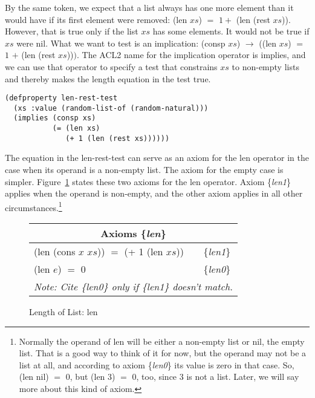 By the same token, we expect that a list always
has one more element than it would have if
its first element were removed: \textsf{(len $xs$)} $=$ $1 +$ \textsf{(len (rest $xs$))}.
However, that is true only if the list $xs$
has some elements. It would not be true if $xs$ were \textsf{nil}.
What we want to test is an implication:
\textsf{(consp $xs$)} $\rightarrow$ (\textsf{(len $xs$)} $=$ $1$ $+$ \textsf{(len (rest $xs$))}$)$.
The ACL2 name for the implication operator is \textsf{implies},
and we can use that operator to specify a test that
constrains $xs$ to non-empty lists and thereby
makes the length equation in the test true.

\begin{code}
\begin{verbatim}
(defproperty len-rest-test
  (xs :value (random-list-of (random-natural)))
  (implies (consp xs)
           (= (len xs)
              (+ 1 (len (rest xs))))))
\end{verbatim}
\end{code}

The equation in the len-rest-test can serve
as an axiom for the \textsf{len} operator in the case
when its operand is a non-empty list.
The axiom for the empty case is simpler.
Figure~\ref{fig:len-axioms} states these two axioms for
the len operator. Axiom \{\emph{len1}\} applies when
the operand is non-empty, and the other axiom
applies in all other circumstances.\footnote{Normally
the operand of len will be either a non-empty list or nil, the empty list.
That is a good way to think of it for now,
but the operand may not be a list at all,
and according to axiom \{\emph{len0}\} its value is zero in that case.
So, \textsf{(len nil)} $=$ $0$, but \textsf{(len $3$)} $=$ $0$, too, since
$3$ is not a list. Later, we will say more about this kind of axiom.}

\begin{figure}
\begin{tabular}{ll}
\multicolumn{2}{c}{Axioms \{\emph{len}\}} \\
\hline
\textsf{(len (cons $x$ $xs$))} $=$ \textsf{(+ 1 (len $xs$))} & \{\emph{len1}\} \\
\textsf{(len $e$)} $=$ 0                            & \{\emph{len0}\} \\
\multicolumn{2}{c}{\emph{Note: Cite \{\emph{len0}\} only if \{\emph{len1}\} doesn't match.}}\\
\end{tabular}
\caption{Length of List: \textsf{len}}
\label{len-equations}\label{fig:len-axioms}
\end{figure}

